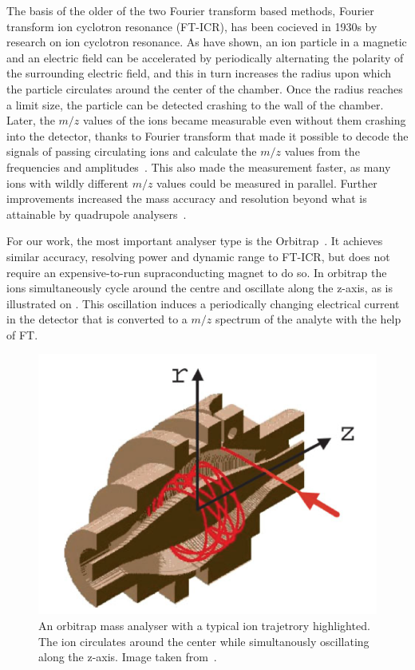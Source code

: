 The basis of the older of the two Fourier transform based methods, Fourier transform ion cyclotron resonance (FT-ICR), has been cocieved in 1930s by research on ion cyclotron resonance. As \citet{lawrence1932production} have shown, an ion particle in a magnetic and an electric field can be accelerated by periodically alternating the polarity of the surrounding electric field, and this in turn increases the radius upon which the particle circulates around the center of the chamber. Once the radius reaches a limit size, the particle can be detected crashing to the wall of the chamber. Later, the \(m/z\) values of the ions became measurable even without them crashing into the detector, thanks to Fourier transform that made it possible to decode the signals of passing circulating ions and calculate the \(m/z\) values from the frequencies and amplitudes~\cite{comisarow1974fourier}. This also made the measurement faster, as many ions with wildly different \(m/z\) values could be measured in parallel. Further improvements increased the mass accuracy and resolution beyond what is attainable by quadrupole analysers~\cite{amster1996fourier, easterling1999routine}.

For our work, the most important analyser type is the Orbitrap~\cite{hu2005orbitrap}. It achieves similar accuracy, resolving power and dynamic range to FT-ICR, but does not require an expensive-to-run supraconducting magnet to do so. In orbitrap the ions simultaneously cycle around the centre and oscillate along the z-axis, as is illustrated on . This oscillation induces a periodically changing electrical current in the detector that is converted to a \(m/z\) spectrum of the analyte with the help of FT\@.

\begin{figure}
  \centering
  \includegraphics[width=.5\linewidth]{img/orbitrap.png}
  \caption{An orbitrap mass analyser with a typical ion trajetrory highlighted. The ion circulates around the center while simultanously oscillating along the z-axis. Image taken from~\citet{hu2005orbitrap}.}\label{fig:orbitrap}
\end{figure}

